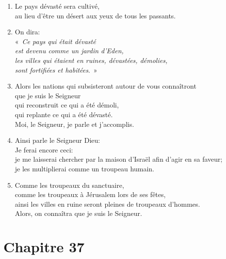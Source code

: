 \begin{enumerate}[leftmargin=\psleftmargin, labelsep = \pslabelsep, label={\arabic*}, font=\color{\pscolor}\small\textsuperscript, parsep=0em, itemsep=0em, topsep=0em ]
    \item Le pays dévasté sera cultivé, \\ au lieu d’être un désert aux yeux de tous les passants.
    \item On dira: \\ \decalage «~\textit{Ce pays qui était dévasté \\ \decalage est devenu comme un jardin d’Eden, \\\decalage les villes qui étaient en ruines, dévastées, démolies, \\ \decalage sont fortifiées et habitées}.~»
    \item Alors les nations qui subsisteront autour de vous connaîtront \\ que je suis le Seigneur \\ qui reconstruit ce qui a été démoli, \\ qui replante ce qui a été dévasté. \\ Moi, le Seigneur, je parle et j’accomplis. \parSpace
    \item  Ainsi parle le Seigneur Dieu: \\ Je ferai encore ceci: \\ je me laisserai chercher par la maison d’Israël afin d’agir en sa faveur; \\ je les multiplierai comme un troupeau humain.
    \item Comme les troupeaux du sanctuaire, \\ comme les troupeaux à Jérusalem lors de ses fêtes, \\ ainsi les villes en ruine seront pleines de troupeaux d’hommes. \\ Alors, on connaîtra que je suis le Seigneur.
\end{enumerate}
\newpage

\section*{Chapitre 37}
